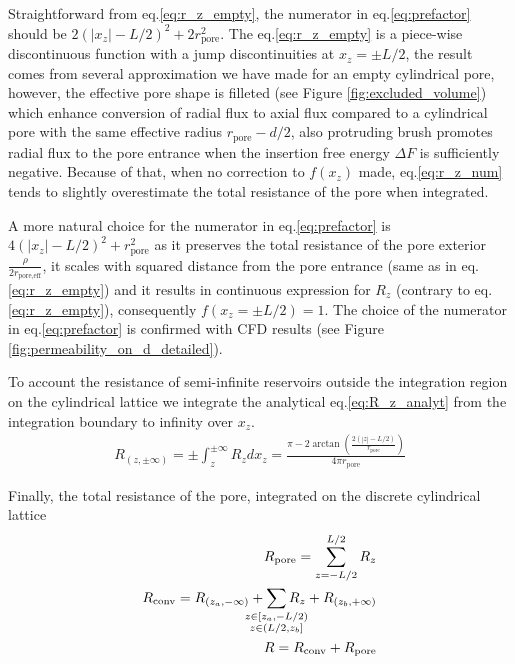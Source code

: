 \documentclass[10pt, a4paper]{article}
\begin{document}
\begin{multicols}{2}
Straightforward from eq.\ref{eq:r_z_empty}, the numerator in eq.\ref{eq:prefactor} should be $2(|x_z|-L/2)^2 + 2r_{\textrm{pore}}^2$.
The eq.\ref{eq:r_z_empty} is a piece-wise discontinuous function with a jump discontinuities at $x_z = \pm L/2$, the result comes from several approximation we have made for an empty cylindrical pore, however, the effective pore shape is filleted (see Figure \ref{fig:excluded_volume}) which enhance conversion of radial flux to axial flux compared to a cylindrical pore with the same effective radius $r_{\textrm{pore}} - d/2$, also protruding brush promotes radial flux to the pore entrance when the insertion free energy $\Delta F$ is sufficiently negative.
Because of that, when no correction to $f(x_z)$ made, eq.\ref{eq:r_z_num} tends to slightly overestimate the total resistance of the pore when integrated.

A more natural choice for the numerator in eq.\ref{eq:prefactor}  is $4(|x_z|-L/2)^2 + r_{\textrm{pore}}^2$ as it preserves the total resistance of the pore exterior $\frac{\rho}{2r_{\textrm{pore,eff}}}$, it scales with squared distance from the pore entrance (same as in eq.\ref{eq:r_z_empty}) and it results in continuous expression for $R_z$ (contrary to eq.\ref{eq:r_z_empty}), consequently $f(x_z = \pm L/2) = 1$.
The choice of the numerator in eq.\ref{eq:prefactor} is confirmed with CFD results (see Figure \ref{fig:permeability_on_d_detailed}).

To account the resistance of semi-infinite reservoirs outside the integration region on the cylindrical lattice we integrate the analytical eq.\ref{eq:R_z_analyt} from the integration boundary to infinity over $x_z$.
\begin{eqnarray}
    \label{eq:r_reservoir}
    R_{(z, \pm\infty)} = \pm \int_{z}^{\pm\infty} R_z dx_z= \frac{\pi - 2\arctan\left(\frac{2(|z|-L/2)}{r_{\textrm{pore}}}\right)}{4\pi r_{\textrm{pore}}}
\end{eqnarray}

Finally, the total resistance of the pore, integrated on the discrete cylindrical lattice
\begin{eqnarray}
    R_{\textrm{pore}} = \sum_{z=-L/2}^{L/2} R_z
    \\
    R_{\textrm{conv}} = R_{(z_{a}, -\infty)} + \sum\limits_{\mathclap{\substack{z \in [z_{a},-L/2)\\z \in (L/2, z_b]}}} R_z + R_{(z_{b}, +\infty)}
    \\
    R = R_{\textrm{conv}} + R_{\textrm{pore}}
\end{eqnarray}

\end{multicols}
\end{document}
